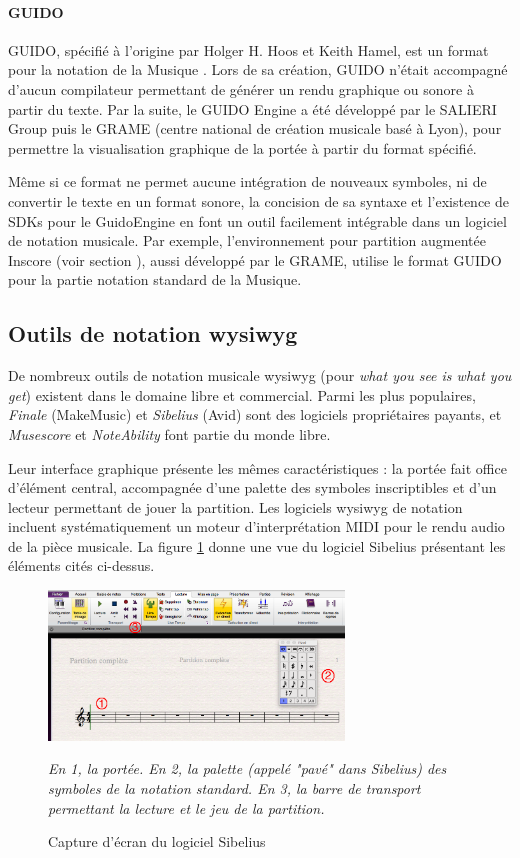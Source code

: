 \paragraph{GUIDO} GUIDO, spécifié à l'origine par Holger H. Hoos et Keith Hamel, est un format pour la notation de la Musique \cite{hoos1998}. Lors de sa création, GUIDO n'était accompagné d'aucun compilateur permettant de générer un rendu graphique ou sonore à partir du texte. Par la suite, le GUIDO Engine a été développé par le SALIERI Group puis le GRAME (centre national de création musicale basé à Lyon), pour permettre la visualisation graphique de la portée à partir du format spécifié. 

Même si ce format ne permet aucune intégration de nouveaux symboles, ni de convertir le texte en un format sonore, la concision de sa syntaxe et l'existence de SDKs pour le GuidoEngine en font un outil facilement intégrable dans un logiciel de notation musicale. Par exemple, l'environnement pour partition augmentée Inscore (voir section ), aussi développé par le GRAME, utilise le format GUIDO pour la partie notation standard de la Musique.    

\subsection{Outils de notation wysiwyg}
\label{subsec:outilsWysiwyg}

De nombreux outils de notation musicale wysiwyg (pour \textit{what you see is what you get}) existent dans le domaine libre et commercial. Parmi les plus populaires, \textit{Finale} (MakeMusic) et \textit{Sibelius} (Avid) sont des logiciels propriétaires payants, et \textit{Musescore} et \textit{NoteAbility} font partie du monde libre.

Leur interface graphique présente les mêmes caractéristiques : la portée fait office d'élément central, accompagnée d'une palette des symboles inscriptibles et d'un lecteur permettant de jouer la partition.
Les logiciels wysiwyg de notation incluent systématiquement un moteur d'interprétation MIDI pour le rendu audio de la pièce musicale.
La figure \ref{fig:sibeliusScreenshot} donne une vue du logiciel Sibelius présentant les éléments cités ci-dessus.

\begin{figure}[H]
	\centering
	\includegraphics[keepaspectratio=true, width=0.7\textwidth]{OutilsInformatiques/i/sibeliusScreenshot.png}
	\caption{Capture d'écran du logiciel Sibelius}
	\label{fig:sibeliusScreenshot}
	\small \it
	En 1, la portée. En 2, la palette (appelé "pavé" dans Sibelius) des symboles de la notation standard.
	En 3, la barre de transport permettant la lecture et le jeu de la partition. 			
\end{figure}

